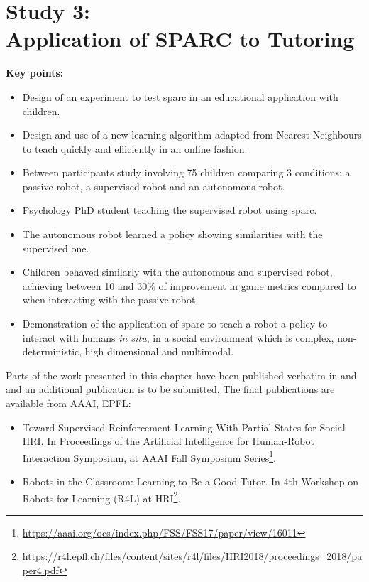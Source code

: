 \chapter[Study 3: Application of SPARC to Tutoring]{Study 3: \\Application of SPARC to Tutoring}\label{chap:tutoring}
\glsresetall
\graphicspath{{images/tutoring/}}

\newcommand{\QI}{by receiving supervision from a human teacher, a robot can learn while only displaying an appropriate behaviour}
\newcommand{\QII}{after learning, such a robot would be able to interact autonomously and efficiently with humans}

\begin{framed}
	\textbf{Key points:}
	
	\begin{itemize}
		\item Design of an experiment to test \acrshort{sparc} in an educational application with children.
		\item Design and use of a new learning algorithm adapted from Nearest Neighbours to teach quickly and efficiently in an online fashion.
		\item Between participants study involving 75 children comparing 3 conditions: a passive robot, a supervised robot and an autonomous robot.
		\item Psychology PhD student teaching the supervised robot using \acrshort{sparc}.
		\item The autonomous robot learned a policy showing similarities with the supervised one.
		\item Children behaved similarly with the autonomous and supervised robot, achieving between 10 and 30\% of improvement in game metrics compared to when interacting with the passive robot.
		\item Demonstration of the application of \acrshort{sparc} to teach a robot a policy to interact with humans \emph{in situ}, in a social environment which is complex, non-deterministic, high dimensional and multimodal.
	\end{itemize}
\end{framed}

Parts of the work presented in this chapter have been published verbatim in \cite{senft2017toward} and \cite{senft2018robots} and an additional publication is to be submitted. The final publications are available from AAAI, EPFL:
\begin{itemize}
	\item Toward Supervised
	Reinforcement Learning With Partial States for Social HRI. In Proceedings of the Artificial Intelligence for Human-Robot Interaction Symposium, at AAAI Fall Symposium Series\footnote{\url{https://aaai.org/ocs/index.php/FSS/FSS17/paper/view/16011}}.
	\item Robots in the Classroom: Learning to Be a Good Tutor. In 4th Workshop on Robots for Learning (R4L) at HRI\footnote{\url{https://r4l.epfl.ch/files/content/sites/r4l/files/HRI2018/proceedings_2018/paper4.pdf}}.
\end{itemize} 

